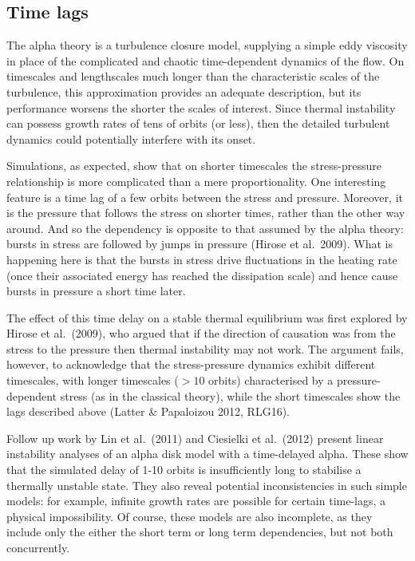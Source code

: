\documentclass[useAMS]{mn2e}
\begin{document}
\subsection{Time lags}

The alpha theory is a turbulence closure model,
supplying a simple eddy viscosity in place of the complicated
and chaotic time-dependent dynamics of the flow. On timescales and
lengthscales much longer than the characteristic scales of the turbulence,
this approximation provides an adequate description, but its
performance worsens the shorter the scales of interest. Since thermal
instability can possess growth rates of tens of orbits (or less), then the
detailed turbulent dynamics could potentially interfere with its onset.

Simulations, as expected, show that on shorter timescales the stress-pressure
relationship is more complicated than a mere proportionality.
One interesting feature is a time lag of a few orbits 
between the stress and
pressure. Moreover, it is the pressure that follows the stress on
shorter times,
rather than the other way around. And so the dependency is opposite 
to that assumed by the alpha theory:
bursts in stress are followed by jumps in pressure (Hirose et
al.~2009). 
What is happening here is that
the bursts in stress drive fluctuations in the heating rate 
(once their associated energy has reached the dissipation scale)
and hence cause bursts in pressure a short time later.

The effect of this time delay on a stable thermal
equilibrium was first explored by Hirose et al.~(2009), who argued
that if the direction of causation was from the stress to the pressure
then thermal instability may not work. The argument fails, however,
to acknowledge that the stress-pressure dynamics exhibit
different timescales, with longer timescales ($>10$ orbits) 
characterised by
a pressure-dependent stress (as in the classical theory), while the
short timescales show the lags described above (Latter \&
Papaloizou 2012, RLG16).

Follow up work by Lin et al.~(2011) and Ciesielki et al.~(2012)
present linear instability analyses of an alpha disk model with a
time-delayed alpha. These show that the simulated delay of 1-10 orbits is
insufficiently long to stabilise a thermally unstable state. They also
reveal potential inconsistencies in such simple models: for example,
infinite growth rates are possible for certain time-lags,
a physical impossibility. Of course,
these models are also incomplete, as they include only the 
either the short term or long term dependencies, but not both concurrently.
\end{document}
